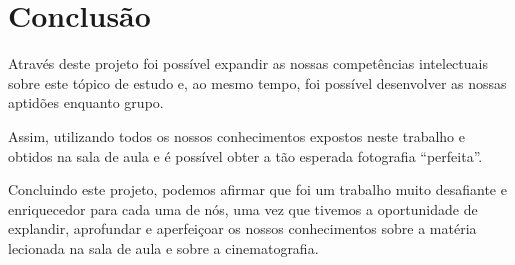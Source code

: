 \documentclass[11pt,a4paper]{report}
\begin{document}
\chapter{Conclusão}
Através deste projeto foi possível expandir as nossas competências intelectuais sobre este tópico de estudo e, ao mesmo tempo, foi possível desenvolver as nossas aptidões enquanto grupo.


Assim, utilizando todos os nossos conhecimentos expostos neste trabalho e obtidos na sala de aula e é possível obter a tão esperada fotografia “perfeita”.


Concluindo este projeto, podemos afirmar que foi um trabalho muito
desafiante e enriquecedor para cada uma de nós, uma vez que tivemos a
oportunidade de explandir, aprofundar e aperfeiçoar os nossos conhecimentos
sobre a matéria lecionada na sala de aula e sobre a cinematografia. 
\appendix
\end{document}
